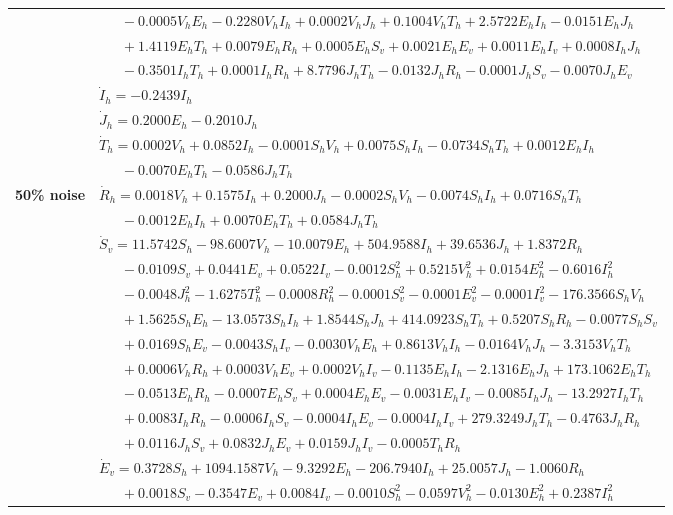 \documentclass[9pt]{article}
\numberwithin{equation}{section}
\begin{document}
\begin{table}[ht]
\begin{tabularx}{1\linewidth}{|l|X|}
        & $\quad\;\;-0.0005V_hE_h-0.2280V_hI_h+0.0002V_hJ_h+0.1004V_hT_h+2.5722E_hI_h-0.0151E_hJ_h$ \\
        & $\quad\;\;+1.4119E_hT_h+0.0079E_hR_h+0.0005E_hS_v+0.0021E_hE_v+0.0011E_hI_v+0.0008I_hJ_h$ \\
        & $\quad\;\;-0.3501I_hT_h+0.0001I_hR_h+8.7796J_hT_h-0.0132J_hR_h-0.0001J_hS_v-0.0070J_hE_v$ \\
        & $\dot{I}_h=-0.2439I_h$ \\
        & $\dot{J}_h=0.2000E_h-0.2010J_h$ \\
        & $\dot{T}_h=0.0002V_h+0.0852I_h-0.0001S_hV_h+0.0075S_hI_h-0.0734S_hT_h+0.0012E_hI_h$ \\
        & $\quad\;\;-0.0070E_hT_h-0.0586J_hT_h$ \\
        \textbf{50\% noise} & $\dot{R}_h=0.0018V_h+0.1575I_h+0.2000J_h-0.0002S_hV_h-0.0074S_hI_h+0.0716S_hT_h$ \\
        & $\quad\;\;-0.0012E_hI_h+0.0070E_hT_h+0.0584J_hT_h$ \\
        & $\dot{S}_v=11.5742S_h-98.6007V_h-10.0079E_h+504.9588I_h+39.6536J_h+1.8372R_h$ \\
        & $\quad\;\;-0.0109S_v+0.0441E_v+0.0522I_v-0.0012S_h^2+0.5215V_h^2+0.0154E_h^2-0.6016I_h^2$ \\
        & $\quad\;\;-0.0048J_h^2-1.6275T_h^2-0.0008R_h^2-0.0001S_v^2-0.0001E_v^2-0.0001I_v^2-176.3566S_hV_h$ \\
        & $\quad\;\;+1.5625S_hE_h-13.0573S_hI_h+1.8544S_hJ_h+414.0923S_hT_h+0.5207S_hR_h-0.0077S_hS_v$ \\
        & $\quad\;\;+0.0169S_hE_v-0.0043S_hI_v-0.0030V_hE_h+0.8613V_hI_h-0.0164V_hJ_h-3.3153V_hT_h$ \\
        & $\quad\;\;+0.0006V_hR_h+0.0003V_hE_v+0.0002V_hI_v-0.1135E_hI_h-2.1316E_hJ_h+173.1062E_hT_h$ \\
        & $\quad\;\;-0.0513E_hR_h-0.0007E_hS_v+0.0004E_hE_v-0.0031E_hI_v-0.0085I_hJ_h-13.2927I_hT_h$ \\
        & $\quad\;\;+0.0083I_hR_h-0.0006I_hS_v-0.0004I_hE_v-0.0004I_hI_v+279.3249J_hT_h-0.4763J_hR_h$ \\
        & $\quad\;\;+0.0116J_hS_v+0.0832J_hE_v+0.0159J_hI_v-0.0005T_hR_h$ \\
        & $\dot{E}_v=0.3728S_h+1094.1587V_h-9.3292E_h-206.7940I_h+25.0057J_h-1.0060R_h$ \\
        & $\quad\;\;+0.0018S_v-0.3547E_v+0.0084I_v-0.0010S_h^2-0.0597V_h^2-0.0130E_h^2+0.2387I_h^2$ \\

\end{tabularx}
\end{table}
\end{document}
